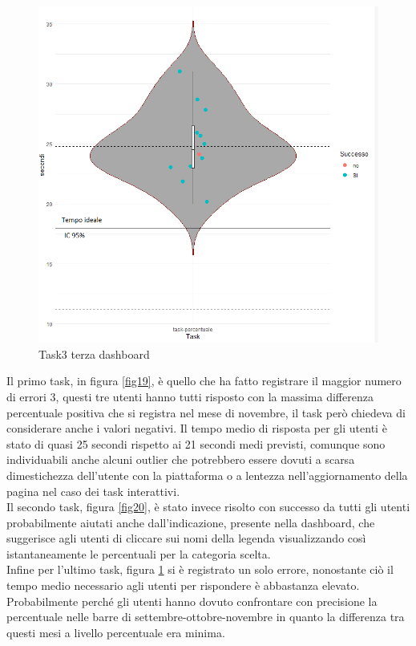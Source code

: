 \documentclass[12pt]{article}
\begin{document}
\begin{figure}[H]
    \centering
    \includegraphics[scale = 0.5]{img/task/Dash3_TaskPercentuale.png}
    \caption{Task3 terza dashboard}
    \label{fig21}
\end{figure}
\noindent Il primo task, in figura \ref{fig19}, è quello che ha fatto registrare il maggior numero di errori 3, questi tre utenti hanno tutti risposto con la massima differenza percentuale positiva che si registra nel mese di novembre, il task però chiedeva di considerare anche i valori negativi. Il tempo medio di risposta per gli utenti è stato di quasi 25 secondi rispetto ai 21 secondi medi previsti, comunque sono individuabili anche alcuni outlier che potrebbero essere dovuti a scarsa dimestichezza dell'utente con la piattaforma o a lentezza nell'aggiornamento della pagina nel caso dei task interattivi.\\
Il secondo task, figura \ref{fig20}, è stato invece risolto con successo da tutti gli utenti probabilmente aiutati anche dall'indicazione, presente nella dashboard, che suggerisce agli utenti di cliccare sui nomi della legenda visualizzando così istantaneamente le percentuali per la categoria scelta.\\
Infine per l'ultimo task, figura \ref{fig21} si è registrato un solo errore, nonostante ciò il tempo medio necessario agli utenti per rispondere è abbastanza elevato. Probabilmente perché gli utenti hanno dovuto confrontare con precisione la percentuale nelle barre di settembre-ottobre-novembre in quanto la differenza tra questi mesi a livello percentuale era minima.\\
\end{document}

